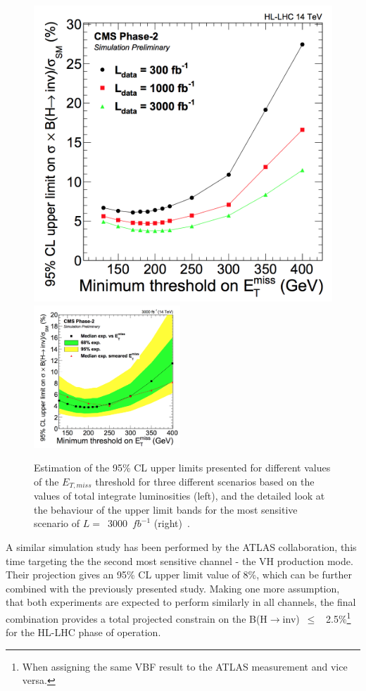 \begin{figure}[htbp]
  \centering
\includegraphics[width=0.49 \textwidth]{Conclusion/YR_limit1.png}
    \includegraphics[width=0.49\textwidth]{Conclusion/YR_limit2.png}

  \caption{Estimation of the 95\% CL upper limits presented for different values of the $E_{T,miss}$ threshold for three different scenarios based on the values of total integrate luminosities (left), and the detailed look at the behaviour of the upper limit bands for the most sensitive scenario of $L=$~3000~$fb^{-1}$ (right)~\cite{yellow_report}.}
  \label{fig:yr_limits}
\end{figure}

\hspace{10pt} A similar simulation study has been performed by the ATLAS collaboration, this time targeting the the second most sensitive channel - the VH production mode. Their projection gives an 95\% CL upper limit value of 8\%, which can be further combined with the previously presented study. Making one more assumption, that both experiments are expected to perform similarly in all channels, the final combination provides a total projected constrain on the B(H$\rightarrow$inv)~$\leq$~ 2.5\%\footnote{When assigning the same VBF result to the ATLAS measurement and vice versa.} for the HL-LHC phase of operation.
